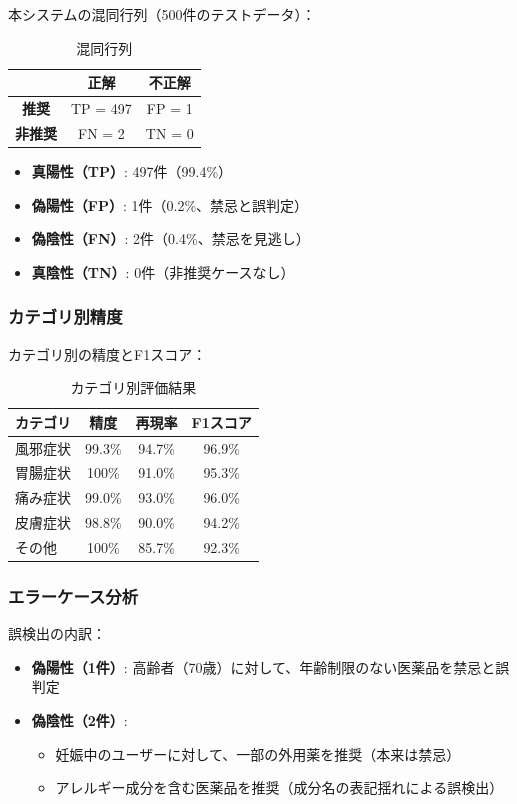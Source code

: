 \documentclass[a4paper,11pt,ja=standard,xelatex]{bxjsarticle}
\theoremstyle{definition}
\begin{document}
本システムの混同行列（500件のテストデータ）：

\begin{table}[!htbp]
\centering
\caption{混同行列}
\begin{tabular}{|c|c|c|}
\hline
 & \textbf{正解} & \textbf{不正解} \\
\hline
\textbf{推奨} & TP = 497 & FP = 1 \\
\hline
\textbf{非推奨} & FN = 2 & TN = 0 \\
\hline
\end{tabular}
\end{table}

\begin{itemize}
\item \textbf{真陽性（TP）}: 497件（99.4\%）
\item \textbf{偽陽性（FP）}: 1件（0.2\%、禁忌と誤判定）
\item \textbf{偽陰性（FN）}: 2件（0.4\%、禁忌を見逃し）
\item \textbf{真陰性（TN）}: 0件（非推奨ケースなし）
\end{itemize}

\subsubsection{カテゴリ別精度}

カテゴリ別の精度とF1スコア：

\begin{table}[!htbp]
\centering
\caption{カテゴリ別評価結果}
\begin{tabular}{|l|c|c|c|}
\hline
\textbf{カテゴリ} & \textbf{精度} & \textbf{再現率} & \textbf{F1スコア} \\
\hline
風邪症状 & 99.3\% & 94.7\% & 96.9\% \\
胃腸症状 & 100\% & 91.0\% & 95.3\% \\
痛み症状 & 99.0\% & 93.0\% & 96.0\% \\
皮膚症状 & 98.8\% & 90.0\% & 94.2\% \\
その他 & 100\% & 85.7\% & 92.3\% \\
\hline
\end{tabular}
\end{table}

\subsubsection{エラーケース分析}

誤検出の内訳：
\begin{itemize}
\item \textbf{偽陽性（1件）}: 高齢者（70歳）に対して、年齢制限のない医薬品を禁忌と誤判定
\item \textbf{偽陰性（2件）}: 
  \begin{itemize}
  \item 妊娠中のユーザーに対して、一部の外用薬を推奨（本来は禁忌）
  \item アレルギー成分を含む医薬品を推奨（成分名の表記揺れによる誤検出）
  \end{itemize}
\end{itemize}
\end{document}
